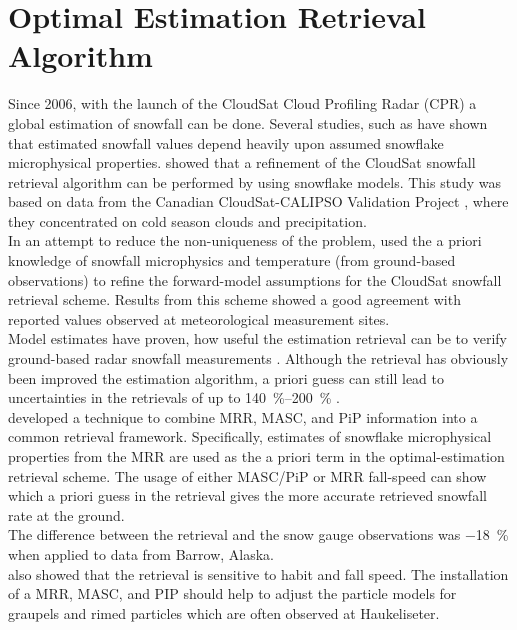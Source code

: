 \section{Optimal Estimation Retrieval Algorithm} %
\label{sec:retrieval}
Since 2006, with the launch of the CloudSat Cloud Profiling Radar (CPR) a global estimation of snowfall can be done. Several studies, such as \citet{kulie_utilizing_2009} have shown that estimated snowfall values depend heavily upon assumed snowflake microphysical properties.
\citet{wood_microphysical_2015} showed that a refinement of the CloudSat snowfall retrieval algorithm can be performed by using snowflake models. 
This study was based on data from the Canadian CloudSat-CALIPSO Validation Project \citep[C3VP,][]{hudak_canadian_2006}, where they concentrated on cold season clouds and precipitation.
\\
In an attempt to reduce the non-uniqueness of the problem, \citet{wood_microphysical_2015} used the a priori knowledge of snowfall microphysics and temperature (from ground-based observations) to refine the forward-model assumptions for the CloudSat snowfall retrieval scheme. 
Results from this scheme showed a good agreement with reported values observed at meteorological measurement sites. \\
Model estimates have proven, how useful the estimation retrieval can be to verify ground-based radar snowfall measurements \citep{norin_intercomparison_2015}.
Although the retrieval has obviously been improved the estimation algorithm, a priori guess can still lead to uncertainties in the retrievals of up to \SIrange{140}{200}{\percent} \citep{wood_estimation_2011}. 
\\
\citet{cooper_variational_2017} developed a technique to combine MRR, MASC, and PiP information into a common retrieval framework. Specifically, estimates of snowflake microphysical properties from the MRR are used as the a priori term in the optimal-estimation retrieval scheme. The usage of either MASC/PiP or MRR fall-speed can show which a priori guess in the retrieval gives the more accurate retrieved snowfall rate at the ground. \\
The difference between the retrieval and the snow gauge observations was \SI{-18}{\percent} when applied to data from Barrow, Alaska.\\
\citet{cooper_variational_2017} also showed that the retrieval is sensitive to habit and fall speed. The installation of a MRR, MASC, and PIP should help to adjust the particle models for graupels and rimed particles which are often observed at Haukeliseter. 
%
\newpage
